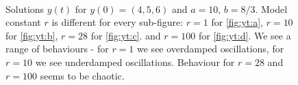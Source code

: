 \documentclass{llncs}
\begin{document}
\begin{figure}
\begin{minipage}{.49\linewidth}
  \end{minipage}
  \\
  \begin{minipage}{.49\linewidth}
    \centering
  \end{minipage}
  \begin{minipage}{.49\linewidth}
    \centering
  \end{minipage}
  \caption{Solutions $y(t)$ for $y(0)=(4,5,6)$ and $a=10$, $b=8/3$. Model constant $r$ is different for every sub-figure:
  $r=1$ for \ref{fig:yt:a}, $r=10$ for \ref{fig:yt:b}, $r=28$ for \ref{fig:yt:c}. and $r=100$ for \ref{fig:yt:d}. We see a range of behaviours - for $r=1$ we see overdamped
  oscillations, for $r=10$ we see underdamped oscillations. Behaviour for $r=28$ and $r=100$ seems to be chaotic.}
\label{fig:yt}
\end{figure}
\end{document}
